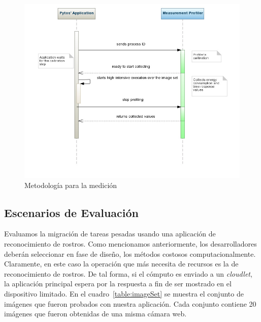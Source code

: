 \begin{figure}[h]
\centering
 \includegraphics[scale=0.45]{Figures/experimentalEnvironment.jpg}
 \caption{Metodología para la medición}
 \label{fig:experimentalSetup}
\end{figure}

\subsection{Escenarios de Evaluación}
\label{subsec:appsample}
Evaluamos la migración de tareas pesadas usando una aplicación de reconocimiento de rostros. Como mencionamos anteriormente, los desarrolladores 
deberán seleccionar en fase de diseño, los métodos costosos computacionalmente. Claramente, en este caso la operación que más necesita de recursos
es la de reconocimiento de rostros. De tal forma, si el cómputo es enviado a un \textit{cloudlet}, la aplicación principal espera por la respuesta
a fin de ser mostrado en el dispositivo limitado. 
En el cuadro~\ref{table:imageSet} se muestra el conjunto de imágenes que fueron probados con nuestra aplicación. Cada conjunto contiene 20 
imágenes que fueron obtenidas de una misma cámara web. 

